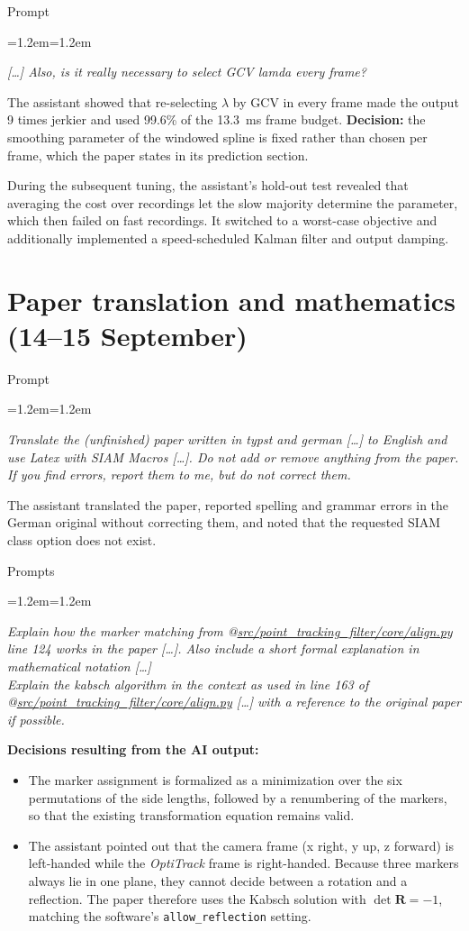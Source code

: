 \documentclass[11pt,a4paper]{article}
\newenvironment{prompt}[1]
  {\par\smallskip\noindent\textsf{\small #1}\par\nopagebreak
   \begin{list}{}{\leftmargin=1.2em\rightmargin=1.2em}\item\itshape\small}
  {\end{list}\smallskip}
\begin{document}
\begin{prompt}{Prompt}
[\dots] Also, is it really necessary to select GCV lamda every frame?
\end{prompt}

The assistant showed that re-selecting $\lambda$ by GCV in every frame made the output 9 times jerkier and used 99.6\% of the 13.3~ms frame budget.
\textbf{Decision:} the smoothing parameter of the windowed spline is fixed rather than chosen per frame, which the paper states in its prediction section.

During the subsequent tuning, the assistant's hold-out test revealed that averaging the cost over recordings let the slow majority determine the parameter, which then failed on fast recordings.
It switched to a worst-case objective and additionally implemented a speed-scheduled Kalman filter and output damping.

\section{Paper translation and mathematics (14--15 September)}

\begin{prompt}{Prompt}
Translate the (unfinished) paper written in typst and german [\dots] to English and use Latex with SIAM Macros [\dots]. Do not add or remove anything from the paper. If you find errors, report them to me, but do not correct them.
\end{prompt}

The assistant translated the paper, reported spelling and grammar errors in the German original without correcting them, and noted that the requested SIAM class option does not exist.

\begin{prompt}{Prompts}
Explain how the marker matching from @\url{src/point_tracking_filter/core/align.py} line 124 works in the paper [\dots]. Also include a short formal explanation in mathematical notation [\dots]\\[2pt]
Explain the kabsch algorithm in the context as used in line 163 of @\url{src/point_tracking_filter/core/align.py} [\dots] with a reference to the original paper if possible.
\end{prompt}

\textbf{Decisions resulting from the AI output:}
\begin{itemize}
  \item The marker assignment is formalized as a minimization over the six permutations of the side lengths, followed by a renumbering of the markers, so that the existing transformation equation remains valid.
  \item The assistant pointed out that the camera frame (x right, y up, z forward) is left-handed while the \emph{OptiTrack} frame is right-handed.
    Because three markers always lie in one plane, they cannot decide between a rotation and a reflection.
    The paper therefore uses the Kabsch solution with $\det \mathbf{R} = -1$, matching the software's \texttt{allow\_reflection} setting.
\end{itemize}
\end{document}
